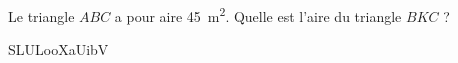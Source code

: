 
\begin{exercice}\label{exosmath-0942}

    Le triangle \( ABC\) a pour aire \SI{45}{\meter\squared}. Quelle est l'aire du triangle \( BKC\) ?

SLULooXaUibV

\end{exercice}
